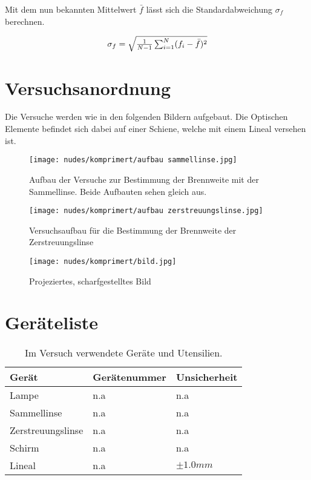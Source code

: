 \documentclass[12pt,a4paper,twoside]{article}
\begin{document}
\noindent
Mit dem nun bekannten Mittelwert $\bar{f}$ lässt sich die Standardabweichung $\sigma_{f}$ berechnen. 

\begin{equation}
    \label{eq:Standardabweichung}
    \centerline{$\sigma_{f} = \sqrt{\frac{1}{N-1} \sum_{i = 1}^{N} (f_i - \bar{f})^2}$} 
\end{equation}

\section{Versuchsanordnung} %
Die Versuche werden wie in den folgenden Bildern aufgebaut. Die Optischen Elemente befindet sich dabei auf einer Schiene, welche mit einem Lineal versehen ist. 


    \begin{figure}[H]
        \centering
        \texttt{[image: nudes/komprimert/aufbau sammellinse.jpg]}
        \caption{Aufbau der Versuche zur Bestimmung der Brennweite mit der Sammellinse. Beide Aufbauten sehen gleich aus. }
        \label{fig:aufbau Sammellinse}
    \end{figure}

    \begin{figure}[H]
        \centering
        \texttt{[image: nudes/komprimert/aufbau zerstreuungslinse.jpg]}
        \caption{Versuchsaufbau für die Bestimmung der Brennweite der Zerstreuungslinse}
        \label{fig:aufbau Zerstreuungslinse}
    \end{figure}

    \begin{figure}[H]
        \centering
        \texttt{[image: nudes/komprimert/bild.jpg]}
        \caption{Projeziertes, scharfgestelltes Bild}
        \label{fig:aufbau Bild}
    \end{figure}

\section{Geräteliste} %

    \begin{table}[H]
        \centering
        \caption{Im Versuch verwendete Geräte und Utensilien.}
        \label{tab:geraete}
        \begin{tabular}{| l | l | l |}
            \hline
            Gerät  & Gerätenummer  & Unsicherheit \\
            \hline
            Lampe & {n.a} & {n.a} \\
            Sammellinse & {n.a} & {n.a} \\
            Zerstreuungslinse & {n.a} & {n.a} \\
            Schirm & {n.a} & {n.a} \\
            Lineal & {n.a} & $\pm 1.0 mm$ \\
        \end{tabular}
    \end{table}
\end{document}

